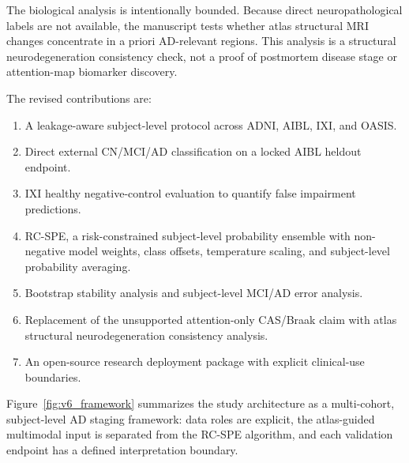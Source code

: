 \documentclass[12pt,a4paper]{article}
\begin{document}
The biological analysis is intentionally bounded. Because direct neuropathological labels are not available, the manuscript tests whether atlas structural MRI changes concentrate in a priori AD-relevant regions. This analysis is a structural neurodegeneration consistency check, not a proof of postmortem disease stage or attention-map biomarker discovery.

The revised contributions are:
\begin{enumerate}[leftmargin=*,itemsep=2pt,label=\textbf{C\arabic*.}]
    \item A leakage-aware subject-level protocol across ADNI, AIBL, IXI, and OASIS.
    \item Direct external CN/MCI/AD classification on a locked AIBL heldout endpoint.
    \item IXI healthy negative-control evaluation to quantify false impairment predictions.
    \item RC-SPE, a risk-constrained subject-level probability ensemble with non-negative model weights, class offsets, temperature scaling, and subject-level probability averaging.
    \item Bootstrap stability analysis and subject-level MCI/AD error analysis.
    \item Replacement of the unsupported attention-only CAS/Braak claim with atlas structural neurodegeneration consistency analysis.
    \item An open-source research deployment package with explicit clinical-use boundaries.
\end{enumerate}

Figure~\ref{fig:v6_framework} summarizes the study architecture as a multi-cohort, subject-level AD staging framework: data roles are explicit, the atlas-guided multimodal input is separated from the RC-SPE algorithm, and each validation endpoint has a defined interpretation boundary.
\end{document}
